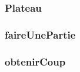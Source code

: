 \documentclass{article}
\begin{document}
\subsubsection{Plateau}


\subsubsection{faireUnePartie}


\subsubsection{obtenirCoup}

\end{document}
